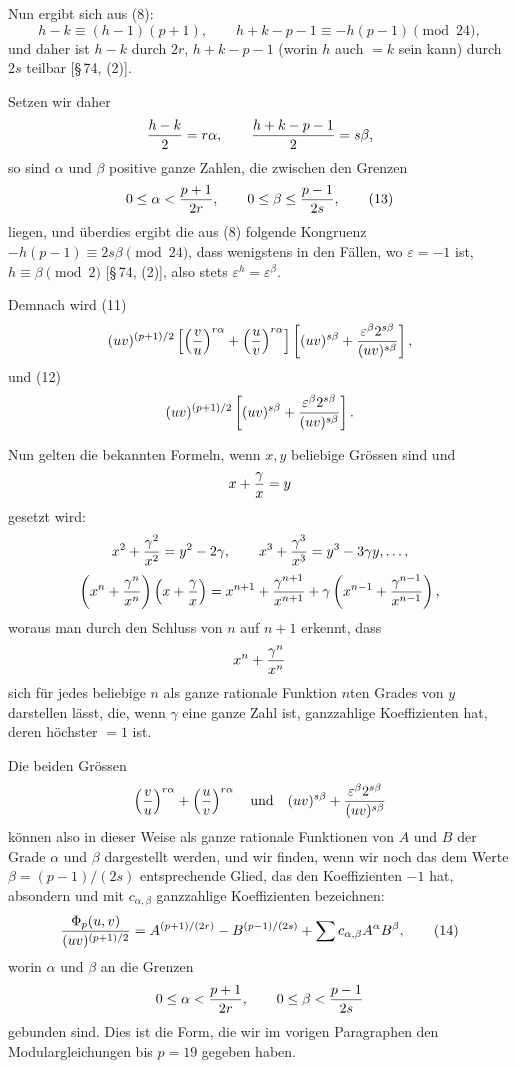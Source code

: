 \documentclass[11pt]{article}
\begin{document}
Nun ergibt sich aus (8):
\[
 h-k\equiv(h-1)(p+1),
 \qquad
 h+k-p-1\equiv-h(p-1)
 \pmod{24},
\]
und daher ist $h-k$ durch $2r$, $h+k-p-1$ (worin $h$ auch $=k$ sein kann) durch $2s$ teilbar [\S\,74, (2)].

Setzen wir daher
\[
 {h-k\over2}=r\alpha,
 \qquad
 {h+k-p-1\over2}=s\beta,
\]
so sind $\alpha$ und $\beta$ positive ganze Zahlen, die zwischen den Grenzen
\begin{equation}
 0\le\alpha<{p+1\over2r},
 \qquad
 0\le\beta\le {p-1\over2s},
\tag{13}
\end{equation}
liegen, und überdies ergibt die aus (8) folgende Kongruenz $-h(p-1)\equiv2s\beta\pmod{24}$, dass wenigstens in den Fällen, wo $\varepsilon=-1$ ist, $h\equiv\beta\pmod2$ [\S\,74, (2)], also stets $\varepsilon^h=\varepsilon^\beta$.

Demnach wird (11)
\[
 (uv)^{(p+1)/2}
 \left[\left({v\over u}\right)^{r\alpha}+\left({u\over v}\right)^{r\alpha}\right]
 \left[(uv)^{s\beta}+{\varepsilon^\beta2^{s\beta}\over(uv)^{s\beta}}\right],
\]
und (12)
\[
 (uv)^{(p+1)/2}
 \left[(uv)^{s\beta}+{\varepsilon^\beta2^{s\beta}\over(uv)^{s\beta}}\right].
\]

Nun gelten die bekannten Formeln, wenn $x,y$ beliebige Grössen sind und
\[
 x+{\gamma\over x}=y
\]
gesetzt wird:
\[
 x^2+{\gamma^2\over x^2}=y^2-2\gamma,
 \qquad
 x^3+{\gamma^3\over x^3}=y^3-3\gamma y,
 \ldots,
\]
\[
 \left(x^n+{\gamma^n\over x^n}\right)
 \left(x+{\gamma\over x}\right)
 =x^{n+1}+{\gamma^{n+1}\over x^{n+1}}
 +\gamma\left(x^{n-1}+{\gamma^{n-1}\over x^{n-1}}\right),
\]
woraus man durch den Schluss von $n$ auf $n+1$ erkennt, dass
\[
 x^n+{\gamma^n\over x^n}
\]
sich für jedes beliebige $n$ als ganze rationale Funktion $n$ten Grades von $y$ darstellen lässt, die, wenn $\gamma$ eine ganze Zahl ist, ganzzahlige Koeffizienten hat, deren höchster $=1$ ist.

Die beiden Grössen
\[
 \left({v\over u}\right)^{r\alpha}+\left({u\over v}\right)^{r\alpha}
 \quad\hbox{und}\quad
 (uv)^{s\beta}+{\varepsilon^\beta2^{s\beta}\over(uv)^{s\beta}}
\]
können also in dieser Weise als ganze rationale Funktionen von $A$ und $B$ der Grade $\alpha$ und $\beta$ dargestellt werden, und wir finden, wenn wir noch das dem Werte $\beta=(p-1)/(2s)$ entsprechende Glied, das den Koeffizienten $-1$ hat, absondern und mit $c_{\alpha,\beta}$ ganzzahlige Koeffizienten bezeichnen:
\begin{equation}
 {\Phi_p(u,v)\over(uv)^{(p+1)/2}}
 =A^{(p+1)/(2r)}-B^{(p-1)/(2s)}
 +\sum c_{\alpha,\beta}A^\alpha B^\beta,
\tag{14}
\end{equation}
worin $\alpha$ und $\beta$ an die Grenzen
\[
 0\le\alpha<{p+1\over 2r},
 \qquad
 0\le\beta<{p-1\over 2s}
\]
gebunden sind. Dies ist die Form, die wir im vorigen Paragraphen den Modulargleichungen bis $p=19$ gegeben haben.
\end{document}
